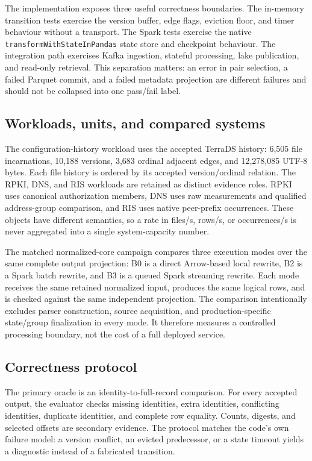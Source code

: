 \documentclass[a4paper,11pt]{article}
\begin{document}
The implementation exposes three useful correctness boundaries. The in-memory transition tests exercise the version buffer, edge flags, eviction floor, and timer behaviour without a transport. The Spark tests exercise the native \texttt{transformWithStateInPandas} state store and checkpoint behaviour. The integration path exercises Kafka ingestion, stateful processing, lake publication, and read-only retrieval. This separation matters: an error in pair selection, a failed Parquet commit, and a failed metadata projection are different failures and should not be collapsed into one pass/fail label.

\subsection{Workloads, units, and compared systems}
The configuration-history workload uses the accepted TerraDS history: 6,505 file incarnations, 10,188 versions, 3,683 ordinal adjacent edges, and 12,278,085 UTF-8 bytes. Each file history is ordered by its accepted version/ordinal relation. The RPKI, DNS, and RIS workloads are retained as distinct evidence roles. RPKI uses canonical authorization members, DNS uses raw measurements and qualified address-group comparison, and RIS uses native peer-prefix occurrences. These objects have different semantics, so a rate in files/s, rows/s, or occurrences/s is never aggregated into a single system-capacity number.

The matched normalized-core campaign compares three execution modes over the same complete output projection: B0 is a direct Arrow-based local rewrite, B2 is a Spark batch rewrite, and B3 is a queued Spark streaming rewrite. Each mode receives the same retained normalized input, produces the same logical rows, and is checked against the same independent projection. The comparison intentionally excludes parser construction, source acquisition, and production-specific state/group finalization in every mode. It therefore measures a controlled processing boundary, not the cost of a full deployed service.

\subsection{Correctness protocol}
The primary oracle is an identity-to-full-record comparison. For every accepted output, the evaluator checks missing identities, extra identities, conflicting identities, duplicate identities, and complete row equality. Counts, digests, and selected offsets are secondary evidence. The protocol matches the code's own failure model: a version conflict, an evicted predecessor, or a state timeout yields a diagnostic instead of a fabricated transition.
\end{document}
